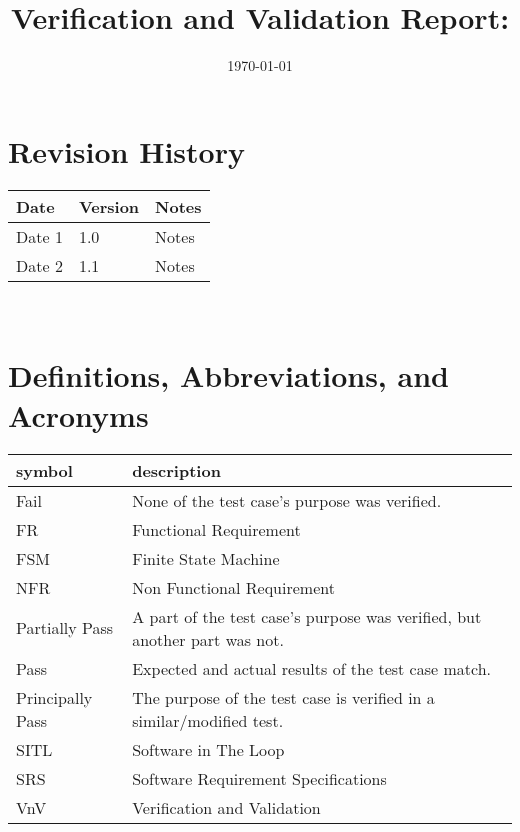 \documentclass[12pt, titlepage]{article}
\begin{document}
\title{Verification and Validation Report: \progname} 
\author{\authname}
\date{\today}
	
\maketitle


\section{Revision History}

\begin{tabularx}{\textwidth}{p{3cm}p{2cm}X}
\toprule {\bf Date} & {\bf Version} & {\bf Notes}\\
\midrule
Date 1 & 1.0 & Notes\\
Date 2 & 1.1 & Notes\\
\bottomrule
\end{tabularx}

~\newpage

\section{Definitions, Abbreviations, and Acronyms}
\label{sec:defAbrev}

\renewcommand{\arraystretch}{1.2}
\begin{tabular}{l l} 
  \toprule		
  \textbf{symbol} & \textbf{description}\\
  \midrule 
  Fail & None of the test case's purpose was verified. \\
  FR & Functional Requirement \\
  FSM & Finite State Machine \\
  NFR & Non Functional Requirement \\
  Partially Pass & A part of the test case's purpose was verified, but another part was not. \\
  Pass & Expected and actual results of the test case match. \\
  Principally Pass & The purpose of the test case is verified in a similar/modified test. \\
  SITL & Software in The Loop \\
  SRS & Software Requirement Specifications \\
  VnV & Verification and Validation \\
  \bottomrule
\end{tabular}\\
\end{document}
